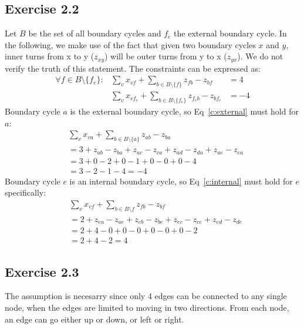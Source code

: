 \subsection{Exercise 2.2}
Let $B$ be the set of all boundary cycles and $f_e$ the external boundary
cycle. In the following, we make use of the fact that given two boundary cycles
$x$ and $y$, inner turns from x to y ($z_{xy}$) will be outer turns from y to x
($z_{yx}$). We do not verify the truth of this statement.  The constraints can
be expressed as:
\begin{align}
  \forall f \in B\setminus \{f_e\} : & \sum_{v} x_{vf} + \sum_{b\in B\setminus \{f\}} z_{fb} - z_{bf} &= 4 
    \label{c:internal} \\
  & \sum_{v} x_{v f_e} + \sum_{b\in B\setminus \{f_e\}} z_{f_e b} - z_{b f_e} &= -4
    \label{c:external}
\end{align}
Boundary cycle $a$ is the external boundary cycle, so Eq~\ref{c:external} must
hold for $a$:
\begin{align*}
  &   \sum_{v} x_{v a} + \sum_{b\in B\setminus \{a\}} z_{a b} - z_{b a} \\
  &=  3 + z_{ab} - z_{ba} + z_{ac} - z_{ca} + z_{ad} - z_{da} + z_{ae} - z_{ea} \\
  &=  3 + 0 - 2 + 0 - 1 + 0 - 0 + 0 - 4 \\
  &=  3 - 2 - 1 - 4 = -4
\end{align*}
Boundary cycle $e$ is an internal boundary cycle, so Eq~\ref{c:internal} must
hold for $e$ specifically:
\begin{align*}
  & \sum_{v} x_{vf} + \sum_{b\in B\setminus f} z_{fb} - z_{bf} \\
  &= 2 + z_{ea} - z_{ae} + z_{eb} - z_{be} + z_{ec} - z_{ce} + z_{ed} - z_{de} \\
  &= 2 + 4 - 0 + 0 - 0 + 0 - 0 + 0 - 2 \\
  &= 2 + 4 - 2 = 4
\end{align*}
\subsection{Exercise 2.3}
The assumption is necesarry since only 4 edges can be connected to any single
node, when the edges are limited to moving in two directions. From each node, an
edge can go either up or down, or left or right.


